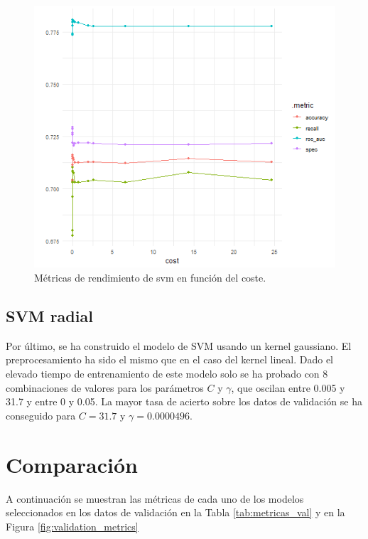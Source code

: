 \documentclass[12pt,a4paper,]{book}
\numberwithin{dummy}{section}
\theoremstyle{ocrenumbox}
\theoremstyle{blacknumex}
\theoremstyle{blacknumbox}
\theoremstyle{ocrenum}
\theoremstyle{ocrenum}
\begin{document}
\begin{figure}[h]
\centering
\includegraphics[width =\textwidth]{graficos/svm_tuningplot.png}
\caption{Métricas de rendimiento de svm en función del coste.}
\label{fig:svm_tuningplot}
\end{figure}

\hypertarget{svm-radial}{%
\subsection{SVM radial}\label{svm-radial}}

Por último, se ha construido el modelo de SVM usando un kernel
gaussiano. El preprocesamiento ha sido el mismo que en el caso del
kernel lineal. Dado el elevado tiempo de entrenamiento de este modelo
solo se ha probado con 8 combinaciones de valores para los parámetros
\(C\) y \(\gamma\), que oscilan entre 0.005 y 31.7 y entre 0 y 0.05. La
mayor tasa de acierto sobre los datos de validación se ha conseguido
para \(C = 31.7\) y \(\gamma = 0.0000496\).

\hypertarget{comparaciuxf3n}{%
\section{Comparación}\label{comparaciuxf3n}}

A continuación se muestran las métricas de cada uno de los modelos
seleccionados en los datos de validación en la Tabla
\ref{tab:metricas_val} y en la Figura \ref{fig:validation_metrics}
\end{document}
